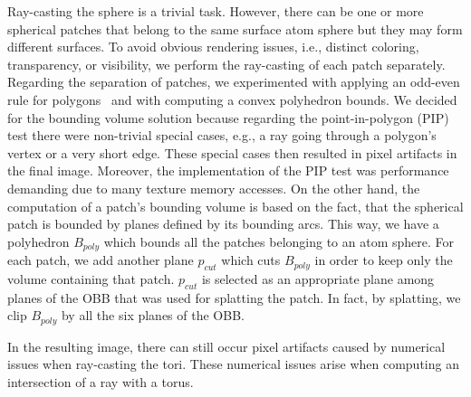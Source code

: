 Ray-casting the sphere is a trivial task. 
However, there can be one or more spherical patches that belong to the same surface atom sphere but they may form different surfaces.
To avoid obvious rendering issues, i.e., distinct coloring, transparency, or visibility, we perform the ray-casting of each patch separately.
Regarding the separation of patches, we experimented with applying an odd-even rule for polygons~\cite{shimrat1962algorithm} and with computing a convex polyhedron bounds.
We decided for the bounding volume solution because regarding the point-in-polygon (PIP) test there were non-trivial special cases, e.g., a ray going through a polygon's vertex or a very short edge.
These special cases then resulted in pixel artifacts in the final image.
Moreover, the implementation of the PIP test was performance demanding due to many texture memory accesses.
On the other hand, the computation of a patch's bounding volume is based on the fact, that the spherical patch is bounded by planes defined by its bounding arcs.
This way, we have a polyhedron $B_{poly}$ which bounds all the patches belonging to an atom sphere.
For each patch, we add another plane $p_{cut}$ which cuts $B_{poly}$ in order to keep only the volume containing that patch.
$p_{cut}$ is selected as an appropriate plane among planes of the OBB that was used for splatting the patch.
In fact, by splatting, we clip $B_{poly}$ by all the six planes of the OBB.

In the resulting image, there can still occur pixel artifacts caused by numerical issues when ray-casting the tori.
These numerical issues arise when computing an intersection of a ray with a torus.

